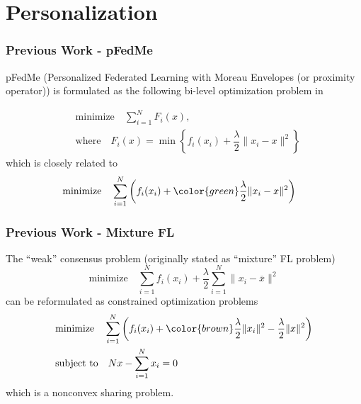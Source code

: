 \section{Personalization}


\begin{frame}
\frametitle{Previous Work - pFedMe}

pFedMe (Personalized Federated Learning with Moreau Envelopes (or proximity operator)) is formulated as the following bi-level optimization problem in \cite{t2020pfedme}

\begin{align*}
    & \text{minimize} \quad \sum\limits_{i=1}^N F_i(x), \\
    & \text{where} \quad F_i(x) = \min \left\{ f_i(x_i) + \dfrac{\lambda}{2} \lVert x_i - x \rVert^2 \right\}
\end{align*}
which is closely related to
\begin{align*}
    & \text{minimize} \quad \sum\limits_{i=1}^N \left( f_i(x_i) + {\color{green} \dfrac{\lambda}{2} \lVert x_i - x \rVert^2} \right)
\end{align*}


\end{frame}


\begin{frame}
\frametitle{Previous Work - Mixture FL}

The ``weak'' consensus problem (originally stated as ``mixture'' FL problem)
$$\text{minimize} \quad \sum\limits_{i=1}^N f_i(x_i) + \dfrac{\lambda}{2} \sum\limits_{i=1}^N \lVert x_i - \overline{x} \rVert^2$$
can be reformulated as constrained optimization problems
\begin{align*}
    & \text{minimize} \quad \sum\limits_{i=1}^N \left( f_i(x_i) + {\color{brown} \dfrac{\lambda}{2} \lVert x_i \rVert^2 -\dfrac{\lambda}{2} \lVert x \rVert^2} \right) \\
    & \text{subject to} \quad Nx - \sum\limits_{i=1}^N x_i = 0
\end{align*}
which is a nonconvex sharing problem.


\end{frame}


